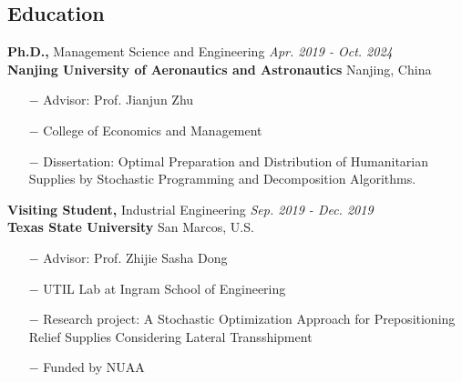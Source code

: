 \documentclass[margin]{res}
\begin{document}
 


\address{\\ [5pt]
Nanjing University of Aeronautics and Astronautics (NUAA) \\
29 Jiangjun Avenue  \\
Nanjing Jiangsu, 211106 China}
\address{\small \it
\hfill Updated: \today \\ [5pt]
Email: \hfill m@guo.ph \\
Homepage: \hfill \href{https://guo.ph}{https://guo.ph} \\[5pt]
}


\begin{resume} 


\vspace{-.8em}
\section{\sc Education}


{\bf Ph.D.,}  Management Science and Engineering \hfill {\it Apr. 2019 - Oct. 2024}\\
{\bf Nanjing University of Aeronautics and Astronautics} \hfill Nanjing, China
\begin{itemize}  \itemsep -2pt  %
\item[\(-\)] Advisor: Prof. Jianjun Zhu
\item[\(-\)] College of Economics and Management
\item[\(-\)] Dissertation: Optimal Preparation and Distribution of Humanitarian Supplies by Stochastic Programming and Decomposition Algorithms.
\end{itemize}
\vspace{-.8em}


{\bf Visiting Student,} Industrial Engineering \hfill {\it Sep. 2019 - Dec. 2019}\\
{\bf Texas State University} \hfill San Marcos, U.S.
\begin{itemize}   \itemsep -2pt  %
\item[\(-\)] Advisor: Prof. Zhijie Sasha Dong
\item[\(-\)] UTIL Lab at Ingram School of Engineering
\item[\(-\)] Research project: A Stochastic Optimization Approach for Prepositioning Relief Supplies Considering Lateral Transshipment
\item[\(-\)] Funded by NUAA
\end{itemize}
\vspace{-.8em}


\end{resume}
\end{document}
